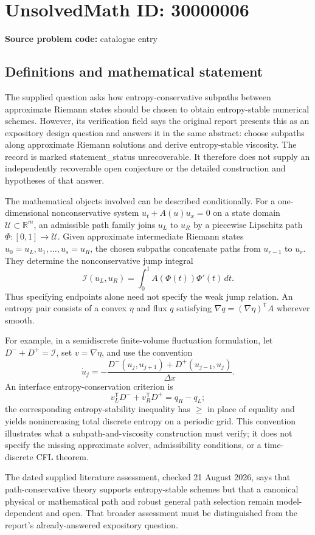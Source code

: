 \documentclass[11pt]{article}
\newcommand{\R}{\mathbb{R}}
\begin{document}
\section*{UnsolvedMath ID: 30000006}
\textbf{Source problem code:} catalogue entry
\subsection{Definitions and mathematical statement}
The supplied question asks how entropy-conservative subpaths between approximate Riemann states should be chosen to obtain entropy-stable numerical schemes. However, its verification field says the original report presents this as an expository design question and answers it in the same abstract: choose subpaths along approximate Riemann solutions and derive entropy-stable viscosity. The record is marked statement\_status unrecoverable. It therefore does not supply an independently recoverable open conjecture or the detailed construction and hypotheses of that answer.

The mathematical objects involved can be described conditionally. For a one-dimensional nonconservative system $u_t+A(u)u_x=0$ on a state domain $\mathcal U\subset\R^m$, an admissible path family joins $u_L$ to $u_R$ by a piecewise Lipschitz path $\Phi:[0,1]\to\mathcal U$. Given approximate intermediate Riemann states $u_0=u_L,u_1,\ldots,u_s=u_R$, the chosen subpaths concatenate paths from $u_{r-1}$ to $u_r$. They determine the nonconservative jump integral
\[
 \mathcal I(u_L,u_R)=\int_0^1 A(\Phi(t))\Phi'(t)\,dt.
\]
Thus specifying endpoints alone need not specify the weak jump relation. An entropy pair consists of a convex $\eta$ and flux $q$ satisfying $\nabla q=(\nabla\eta)^{\mathsf T}A$ wherever smooth.

For example, in a semidiscrete finite-volume fluctuation formulation, let $D^-+D^+=\mathcal I$, set $v=\nabla\eta$, and use the convention
\[
 \dot u_j=-\frac{D^-(u_j,u_{j+1})+D^+(u_{j-1},u_j)}{\Delta x}.
\]
An interface entropy-conservation criterion is
\[
 v_L^{\mathsf T}D^-+v_R^{\mathsf T}D^+=q_R-q_L;
\]
the corresponding entropy-stability inequality has $\geq$ in place of equality and yields nonincreasing total discrete entropy on a periodic grid. This convention illustrates what a subpath-and-viscosity construction must verify; it does not specify the missing approximate solver, admissibility conditions, or a time-discrete CFL theorem.

The dated supplied literature assessment, checked 21 August 2026, says that path-conservative theory supports entropy-stable schemes but that a canonical physical or mathematical path and robust general path selection remain model-dependent and open. That broader assessment must be distinguished from the report's already-answered expository question.
\end{document}
